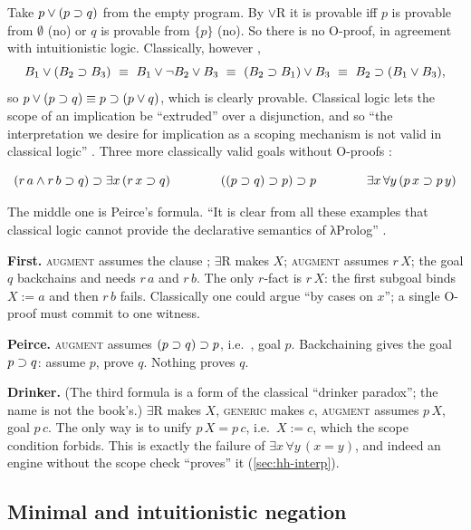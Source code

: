 {{Take $p\vee(p\supset q)$ from the empty program. By $\vee$R it is provable iff $p$ is provable from $\emptyset$
(no) or $q$ is provable from $\{p\}$ (no). So there is no O-proof, in agreement with intuitionistic logic.
Classically, however ,
\[
B_1\vee(B_2\imp B_3)\ \equiv\ B_1\vee\neg B_2\vee B_3\ \equiv\ (B_2\imp B_1)\vee B_3\ \equiv\ B_2\imp(B_1\vee B_3),
\]
so $p\vee(p\supset q)\equiv p\supset(p\vee q)$, which is clearly provable. Classical logic lets the scope of an
implication be ``extruded'' over a disjunction, and so
``the interpretation we desire for implication as a scoping mechanism is not valid in classical logic''
. Three more classically valid goals without O-proofs :
\begin{fullwidth}
\[
(r\,a\wedge r\,b\supset q)\supset\exists x\,(r\,x\supset q)
\qquad\qquad
((p\supset q)\supset p)\supset p
\qquad\qquad
\exists x\,\forall y\,(p\,x\supset p\,y)
\]
\end{fullwidth}
The middle one is Peirce's formula. ``It is clear from all these examples that classical logic cannot
provide the declarative semantics of λProlog'' .

\begin{tutorial}
\textbf{First.} \textsc{augment} assumes the clause ; $\exists$R makes $X$;
\textsc{augment} assumes $r\,X$; the goal $q$ backchains and needs $r\,a$ and $r\,b$. The only $r$-fact is
$r\,X$: the first subgoal binds $X:=a$ and then $r\,b$ fails. Classically one could argue ``by cases on
$x$''; a single O-proof must commit to one witness.

\textbf{Peirce.} \textsc{augment} assumes $(p\supset q)\supset p$, i.e.\ ,
goal $p$. Backchaining gives the goal $p\supset q$: assume $p$, prove $q$. Nothing proves $q$.

\textbf{Drinker.} (The third formula is a form of the classical ``drinker paradox''; the name is not the
book's.) $\exists$R makes $X$, \textsc{generic} makes $c$, \textsc{augment} assumes $p\,X$, goal
$p\,c$. The only way is to unify $p\,X=p\,c$, i.e.\ $X:=c$, which the scope condition forbids. This is
exactly the failure of $\exists x\,\forall y\,(x=y)$, and indeed an engine without the scope check
``proves'' it (\cref{sec:hh-interp}).
\end{tutorial}

\subsection{Minimal and intuitionistic negation}\label{sec:hh-minimal}

}}
